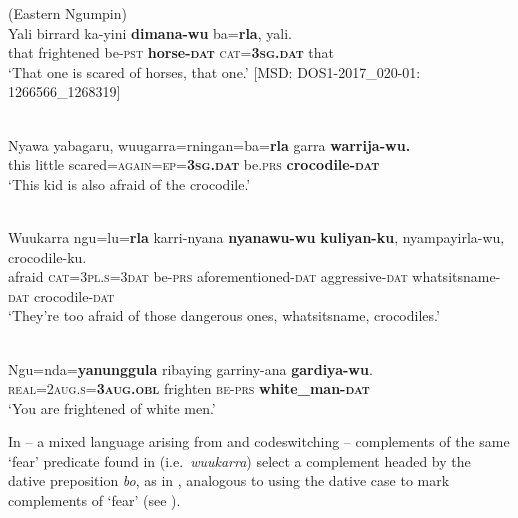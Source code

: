 \documentclass[output=paper,colorlinks,citecolor=brown]{langscibook}
\begin{document}
\ea 
\textnormal{ (Eastern Ngumpin)} \\
\gll Yali birrard ka-yini \textbf{dimana-wu} ba=\textbf{rla}, yali. \\
that frightened be-\textsc{pst} \textbf{horse-\textsc{dat}} \textsc{cat=\textbf{3sg.dat}} that \\
\glt `That one is scared of horses, that one.' $[$MSD: DOS1-2017\_020-01: 1266566\_1268319$]$
\label{ex:bro35}
\z

\ea 
{} \\
\gll Nyawa yabagaru, wuugarra=rningan=ba=\textbf{rla} garra \textbf{warrija-wu.} \\
this little scared=\textsc{again=ep=\textbf{3sg.dat}} be.\textsc{prs} \textbf{crocodile-\textsc{dat}} \\
\glt `This kid is also afraid of the crocodile.' 
\label{ex:bro36}
\z

\ea 
{} \\
\gll Wuukarra ngu=lu=\textbf{rla} karri-nyana \textbf{nyanawu-wu} \textbf{kuliyan-ku}, nyampayirla-wu, crocodile-ku. \\
afraid \textsc{cat=3pl.s=3dat} be-\textsc{prs} aforementioned-\textsc{dat} aggressive-\textsc{dat} whatsitsname-\textsc{dat} crocodile-\textsc{dat} \\
\glt `They're too afraid of those dangerous ones, whatsitsname, crocodiles.'
\label{ex:bro37}
\z

\ea 
{} \\
\gll Ngu=nda=\textbf{yanunggula}	ribaying	garriny-ana	\textbf{gardiya-wu}. \\
\textsc{real=2aug.s=\textbf{3aug.obl}} frighten \textsc{be-prs} \textbf{white\_man-\textsc{dat}} \\
\glt `You are frightened of white men.' 
\label{ex:bro38}
\z

\largerpage
 In   -- a mixed language arising from  and  codeswitching \citep{mcconvell_gurindji_2005} -- complements of the same `fear' predicate found in  (i.e.\  \textit{wuukarra}) select a complement headed by the dative preposition \textit{bo}, as in , analogous to  using the dative case to mark complements of `fear' (see \cite[430--431]{meakins_case-marking_2008}).
\end{document}
